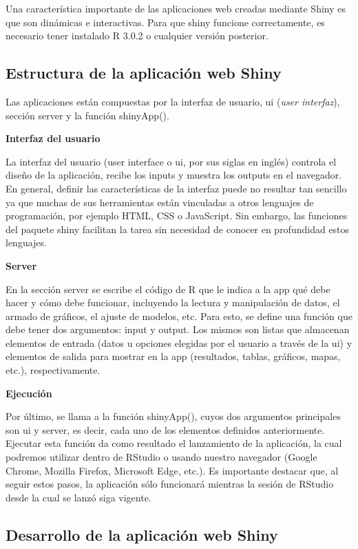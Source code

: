 Una característica importante de las aplicaciones web creadas mediante Shiny es que son dinámicas e interactivas. Para que shiny funcione correctamente, es necesario tener instalado R 3.0.2 o cualquier versión posterior.

\subsection{Estructura de la aplicación web Shiny}

Las aplicaciones están compuestas por la interfaz de usuario, ui (\emph{user interfaz}), sección server y la función shinyApp(). 


\textbf{Interfaz del usuario}

La interfaz del usuario (user interface o ui, por sus siglas en inglés) controla el diseño de la aplicación, recibe los inputs y muestra los outputs en el navegador. En general, definir las características de la interfaz puede no resultar tan sencillo ya que muchas de sus herramientas están vinculadas a otros lenguajes de programación, por ejemplo HTML, CSS o JavaScript. Sin embargo, las funciones del paquete shiny facilitan la tarea sin necesidad de conocer en profundidad estos lenguajes.

\textbf{Server}

En la sección server se escribe el código de R que le indica a la app qué debe hacer y cómo debe funcionar, incluyendo la lectura y manipulación de datos, el armado de gráficos, el ajuste de modelos, etc. Para esto, se define una función que debe tener dos argumentos: input y output. Los mismos son listas que almacenan elementos de entrada (datos u opciones elegidas por el usuario a través de la ui) y elementos de salida para mostrar en la app (resultados, tablas, gráficos, mapas, etc.), respectivamente.


\textbf{Ejecución}

Por último, se llama a la función shinyApp(), cuyos dos argumentos principales son ui y server, es decir, cada uno de los elementos definidos anteriormente. Ejecutar esta función da como resultado el lanzamiento de la aplicación, la cual podremos utilizar dentro de RStudio o usando nuestro navegador (Google Chrome, Mozilla Firefox, Microsoft Edge, etc.). Es importante destacar que, al seguir estos pasos, la aplicación sólo funcionará mientras la sesión de RStudio desde la cual se lanzó siga vigente.


\subsection{Desarrollo de la aplicación web Shiny}

